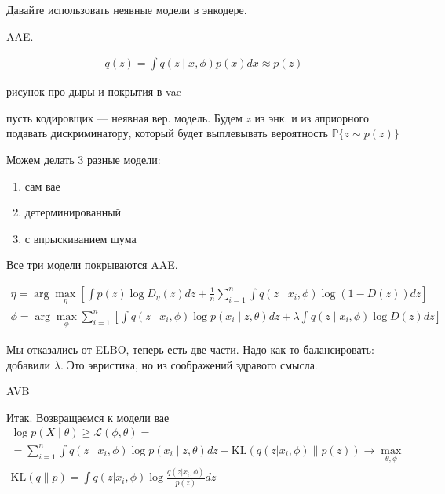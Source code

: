 \documentclass{book}
\begin{document}

Давайте использовать неявные модели в энкодере.

AAE.

\begin{gather*}
  q(z)=\int {q(z\mid x,\phi)p(x)dx}\approx p(z)
\end{gather*}

рисунок про дыры и покрытия в vae

пусть кодировщик --- неявная вер. модель. Будем $z$ из энк. и из априорного подавать дискриминатору, который будет выплевывать вероятность $\mathbb{P}\{z \sim p(z)\}$

Можем делать 3 разные модели:
\begin{enumerate}
  \item сам вае
  \item детерминированный
  \item с впрыскиванием шума
\end{enumerate}

Все три модели покрываются AAE.

\begin{gather*}
  \eta = \arg\max_\eta\left[\int {p(z)\log D_\eta(z)dz}+\frac{1}{n}\sum_{i=1}^{n} {\int {q(z\mid x_i,\phi)\log(1-D(z))dz}}\right]\\
  \phi=\arg\max_\phi \sum_{i=1}^{n} {\left[\int {q(z\mid x_i,\phi)\log p(x_i\mid z,\theta)dz} + \lambda\int {q(z\mid x_i, \phi)\log D(z)dz}\right]}
\end{gather*}

Мы отказались от ELBO, теперь есть две части. Надо как-то балансировать: добавили $\lambda$. Это эвристика, но из соображений здравого смысла.

AVB

Итак. Возвращаемся к модели вае
\begin{gather*}
  \log p(X\mid \theta) \geq \mathcal{L}(\phi,\theta)=\\
  =\sum_{i=1}^{n} {\int {q(z\mid x_i,\phi)\log p(x_i\mid z,\theta)dz}-\mathrm{KL}(q(z|x_i,\phi)\|p(z))} \rightarrow \max_{\theta,\phi}\\
  \mathrm{KL}(q\|p)=\int {q(z|x_i,\phi)\log \frac{q(z|x_i,\phi)}{p(z)}dz}
\end{gather*}
\end{document}
